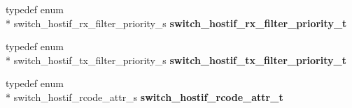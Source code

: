 \begin{DoxyCompactItemize}
\item 
\hypertarget{group__HostInterface_ga80eb043a62ab9c29adc9e5df77f2bb1f}{typedef enum \\*
switch\+\_\+hostif\+\_\+rx\+\_\+filter\+\_\+priority\+\_\+s {\bfseries switch\+\_\+hostif\+\_\+rx\+\_\+filter\+\_\+priority\+\_\+t}}\label{group__HostInterface_ga80eb043a62ab9c29adc9e5df77f2bb1f}

\item 
\hypertarget{group__HostInterface_ga2725f9b6b3275e45c505199fef684881}{typedef enum \\*
switch\+\_\+hostif\+\_\+tx\+\_\+filter\+\_\+priority\+\_\+s {\bfseries switch\+\_\+hostif\+\_\+tx\+\_\+filter\+\_\+priority\+\_\+t}}\label{group__HostInterface_ga2725f9b6b3275e45c505199fef684881}

\item 
\hypertarget{group__HostInterface_gadb64d79a14b98022b85e20e97c43f16e}{typedef enum \\*
switch\+\_\+hostif\+\_\+rcode\+\_\+attr\+\_\+s {\bfseries switch\+\_\+hostif\+\_\+rcode\+\_\+attr\+\_\+t}}\label{group__HostInterface_gadb64d79a14b98022b85e20e97c43f16e}


\end{DoxyCompactItemize}
